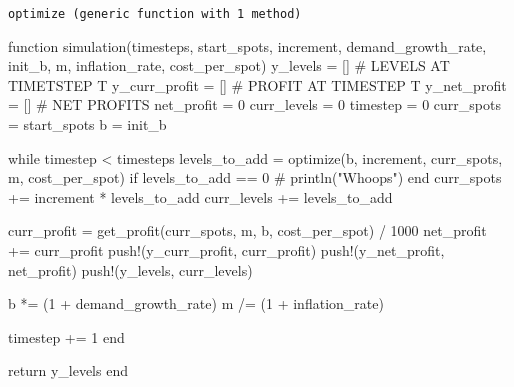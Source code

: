 \documentclass[
  letterpaper,
  DIV=11,
  numbers=noendperiod]{scrartcl}
\newenvironment{Shaded}{\begin{snugshade}}{\end{snugshade}}
\newcommand{\CommentTok}[1]{\textcolor[rgb]{0.37,0.37,0.37}{#1}}
\newcommand{\ControlFlowTok}[1]{\textcolor[rgb]{0.00,0.23,0.31}{#1}}
\newcommand{\FloatTok}[1]{\textcolor[rgb]{0.68,0.00,0.00}{#1}}
\newcommand{\FunctionTok}[1]{\textcolor[rgb]{0.28,0.35,0.67}{#1}}
\newcommand{\KeywordTok}[1]{\textcolor[rgb]{0.00,0.23,0.31}{#1}}
\newcommand{\NormalTok}[1]{\textcolor[rgb]{0.00,0.23,0.31}{#1}}
\newcommand{\OperatorTok}[1]{\textcolor[rgb]{0.37,0.37,0.37}{#1}}
\begin{document}
\begin{verbatim}
optimize (generic function with 1 method)
\end{verbatim}

\begin{Shaded}
\begin{Highlighting}[]
\KeywordTok{function} \FunctionTok{simulation}\NormalTok{(timesteps, start\_spots, increment, demand\_growth\_rate, init\_b, m, inflation\_rate, cost\_per\_spot)}
\NormalTok{    y\_levels }\OperatorTok{=}\NormalTok{ [] }\CommentTok{\# LEVELS AT TIMETSTEP T}
\NormalTok{    y\_curr\_profit }\OperatorTok{=}\NormalTok{ [] }\CommentTok{\# PROFIT AT TIMESTEP T}
\NormalTok{    y\_net\_profit }\OperatorTok{=}\NormalTok{ [] }\CommentTok{\# NET PROFITS}
\NormalTok{    net\_profit }\OperatorTok{=} \FloatTok{0}
\NormalTok{    curr\_levels }\OperatorTok{=} \FloatTok{0}
\NormalTok{    timestep }\OperatorTok{=} \FloatTok{0}
\NormalTok{    curr\_spots }\OperatorTok{=}\NormalTok{ start\_spots}
\NormalTok{    b }\OperatorTok{=}\NormalTok{ init\_b}

    \ControlFlowTok{while}\NormalTok{ timestep }\OperatorTok{\textless{}}\NormalTok{ timesteps}
\NormalTok{        levels\_to\_add }\OperatorTok{=} \FunctionTok{optimize}\NormalTok{(b, increment, curr\_spots, m, cost\_per\_spot)}
        \ControlFlowTok{if}\NormalTok{ levels\_to\_add }\OperatorTok{==} \FloatTok{0}
            \CommentTok{\# println("Whoops")}
        \ControlFlowTok{end}
\NormalTok{        curr\_spots }\OperatorTok{+=}\NormalTok{ increment }\OperatorTok{*}\NormalTok{ levels\_to\_add}
\NormalTok{        curr\_levels }\OperatorTok{+=}\NormalTok{ levels\_to\_add}

\NormalTok{        curr\_profit }\OperatorTok{=} \FunctionTok{get\_profit}\NormalTok{(curr\_spots, m, b, cost\_per\_spot) }\OperatorTok{/} \FloatTok{1000}
\NormalTok{        net\_profit }\OperatorTok{+=}\NormalTok{ curr\_profit}
        \FunctionTok{push!}\NormalTok{(y\_curr\_profit, curr\_profit)}
        \FunctionTok{push!}\NormalTok{(y\_net\_profit, net\_profit)}
        \FunctionTok{push!}\NormalTok{(y\_levels, curr\_levels)}

\NormalTok{        b }\OperatorTok{*=}\NormalTok{ (}\FloatTok{1} \OperatorTok{+}\NormalTok{ demand\_growth\_rate)}
\NormalTok{        m }\OperatorTok{/=}\NormalTok{ (}\FloatTok{1} \OperatorTok{+}\NormalTok{ inflation\_rate)}

\NormalTok{        timestep }\OperatorTok{+=} \FloatTok{1} 
    \ControlFlowTok{end}

    \ControlFlowTok{return}\NormalTok{ y\_levels}
\KeywordTok{end}
\end{Highlighting}
\end{Shaded}
\end{document}
